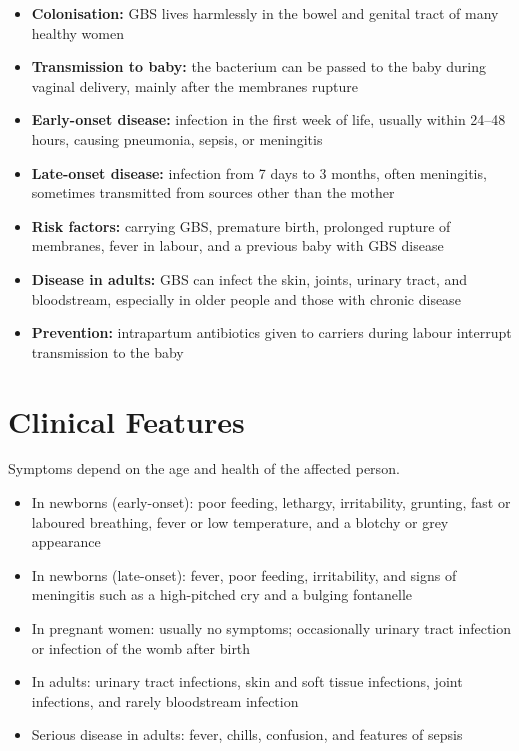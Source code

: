 \begin{itemize}
    \item \textbf{Colonisation:} GBS lives harmlessly in the bowel and genital tract of many healthy women
    \item \textbf{Transmission to baby:} the bacterium can be passed to the baby during vaginal delivery, mainly after the membranes rupture
    \item \textbf{Early-onset disease:} infection in the first week of life, usually within 24--48 hours, causing pneumonia, sepsis, or meningitis
    \item \textbf{Late-onset disease:} infection from 7 days to 3 months, often meningitis, sometimes transmitted from sources other than the mother
    \item \textbf{Risk factors:} carrying GBS, premature birth, prolonged rupture of membranes, fever in labour, and a previous baby with GBS disease
    \item \textbf{Disease in adults:} GBS can infect the skin, joints, urinary tract, and bloodstream, especially in older people and those with chronic disease
    \item \textbf{Prevention:} intrapartum antibiotics given to carriers during labour interrupt transmission to the baby
\end{itemize}

\section*{Clinical Features}
Symptoms depend on the age and health of the affected person.

\begin{itemize}
    \item In newborns (early-onset): poor feeding, lethargy, irritability, grunting, fast or laboured breathing, fever or low temperature, and a blotchy or grey appearance
    \item In newborns (late-onset): fever, poor feeding, irritability, and signs of meningitis such as a high-pitched cry and a bulging fontanelle
    \item In pregnant women: usually no symptoms; occasionally urinary tract infection or infection of the womb after birth
    \item In adults: urinary tract infections, skin and soft tissue infections, joint infections, and rarely bloodstream infection
    \item Serious disease in adults: fever, chills, confusion, and features of sepsis
\end{itemize}

